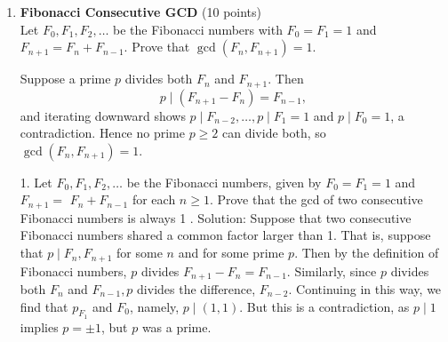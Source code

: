 \begin{enumerate}
  \item \textbf{Fibonacci Consecutive GCD} (10 points)\\
  Let \(F_0, F_1, F_2, \ldots\) be the Fibonacci numbers with \(F_0=F_1=1\) and \(F_{n+1}=F_n+F_{n-1}\).  Prove that \(\gcd(F_n,F_{n+1})=1\).\\
  \begin{subanswer}
  Suppose a prime \(p\) divides both \(F_n\) and \(F_{n+1}\).  Then
  \[
    p\mid(F_{n+1}-F_n)=F_{n-1},
  \]
  and iterating downward shows \(p\mid F_{n-2},\ldots,p\mid F_1=1\) and \(p\mid F_0=1\), a contradiction.  Hence no prime \(p\ge2\) can divide both, so \(\gcd(F_n,F_{n+1})=1\).
  \end{subanswer}
  1. Let $F_0, F_1, F_2, \ldots$ be the Fibonacci numbers, given by $F_0=F_1=1$ and $F_{n+1}=$ $F_n+F_{n-1}$ for each $n \geq 1$. Prove that the gcd of two consecutive Fibonacci numbers is always 1 .
  Solution:
  Suppose that two consecutive Fibonacci numbers shared a common factor larger than 1. That is, suppose that $p \mid F_n, F_{n+1}$ for some $n$ and for some prime $p$. Then by the definition of Fibonacci numbers, $p$ divides $F_{n+1}-F_n=F_{n-1}$. Similarly, since $p$ divides both $F_n$ and $F_{n-1}, p$ divides the difference, $F_{n-2}$. Continuing in this way, we find that $p_{F_1}$ and $F_0$, namely, $p \mid(1,1)$. But this is a contradiction, as $p \mid 1$ implies $p= \pm 1$, but $p$ was a prime.
  
  


\end{enumerate}
